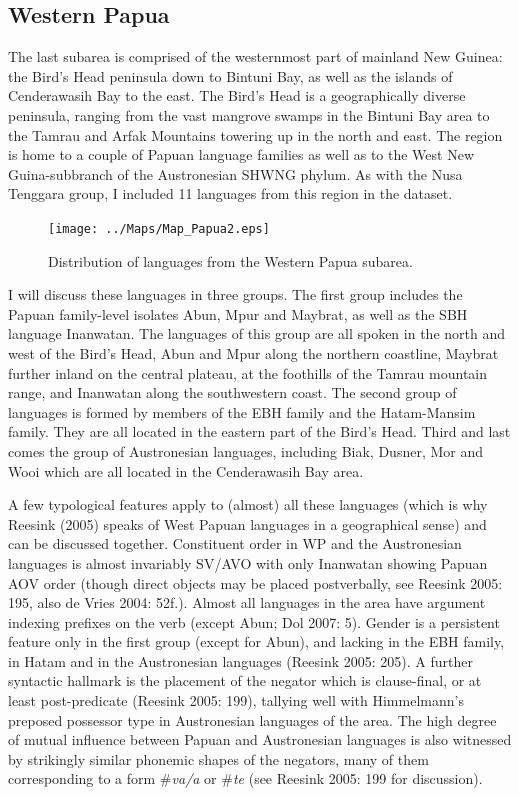 \subsection{Western Papua}\label{sec:westpapua2}

The last subarea is comprised of the westernmost part of mainland New Guinea: the Bird's Head peninsula down to Bintuni Bay, as well as the islands of Cenderawasih Bay to the east. The Bird's Head is a geographically diverse peninsula, ranging from the vast mangrove swamps in the Bintuni Bay area to the Tamrau and Arfak Mountains towering up in the north and east. The region is home to a couple of Papuan language families as well as to the West New Guina-subbranch of the Austronesian SHWNG phylum. As with the Nusa Tenggara group, I included 11 languages from this region in the dataset. 

\begin{figure}
\begin{center}
\texttt{[image: ../Maps/Map\_Papua2.eps]}
\caption{Distribution of languages from the Western Papua subarea.}\label{map:Pap}
\end{center}
\end{figure}

I will discuss these languages in three groups. The first group includes the Papuan family-level isolates Abun, Mpur and Maybrat, as well as the \acs{SBH} language Inanwatan. The languages of this group are all spoken in the north and west of the Bird's Head, Abun and Mpur along the northern coastline, Maybrat further inland on the central plateau, at the foothills of the Tamrau mountain range, and Inanwatan along the southwestern coast. The second group of languages is formed by members of the EBH family and the Hatam-Mansim family. They are all located in the eastern part of the Bird's Head. Third and last comes the group of Austronesian languages, including Biak, Dusner, Mor and Wooi which are all located in the Cenderawasih Bay area.

A few typological features apply to (almost) all these languages (which is why Reesink (2005) speaks of West Papuan languages in a geographical sense) and can be discussed together. Constituent order in WP  and the Austronesian languages is almost invariably SV/AVO with only Inanwatan showing Papuan AOV order (though direct objects may be placed postverbally, see Reesink 2005: 195, also de Vries 2004: 52f.). Almost all languages in the area have argument indexing prefixes on the verb (except Abun; Dol 2007: 5). Gender is a persistent feature only in the first group (except for Abun), and lacking in the \acs{EBH} family, in Hatam and in the Austronesian languages (Reesink 2005: 205). A further syntactic hallmark is the placement of the negator which is clause-final, or at least post-predicate (Reesink 2005: 199), tallying well with Himmelmann's  preposed possessor type in Austronesian languages of the area. The high degree of mutual influence between Papuan and Austronesian languages is also witnessed by strikingly similar phonemic shapes of the negators, many of them corresponding to a form \#\textit{va/\textipa{\textbeta}a} or \#\textit{te} (see Reesink 2005: 199 for discussion).

